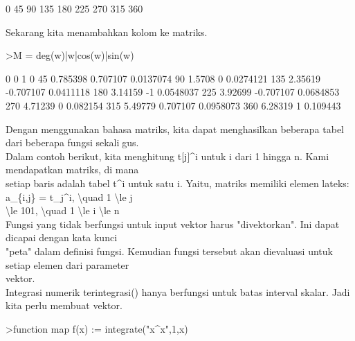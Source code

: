\documentclass[a4paper,10pt]{article}
\begin{document}
\begin{eulernotebook}
\begin{eulercomment}
\begin{eulercomment}
\begin{eulercomment}
\begin{eulercomment}
\begin{euleroutput}
              0 
             45 
             90 
            135 
            180 
            225 
            270 
            315 
            360 
\end{euleroutput}
\begin{eulercomment}
Sekarang kita menambahkan kolom ke matriks.
\end{eulercomment}
\begin{eulerprompt}
>M = deg(w)|w|cos(w)|sin(w)
\end{eulerprompt}
\begin{euleroutput}
              0             0             1             0 
             45      0.785398      0.707107     0.0137074 
             90        1.5708             0     0.0274121 
            135       2.35619     -0.707107     0.0411118 
            180       3.14159            -1     0.0548037 
            225       3.92699     -0.707107     0.0684853 
            270       4.71239             0      0.082154 
            315       5.49779      0.707107     0.0958073 
            360       6.28319             1      0.109443 
\end{euleroutput}
\begin{eulercomment}
Dengan menggunakan bahasa matriks, kita dapat menghasilkan beberapa
tabel dari beberapa fungsi sekaligus.\\
Dalam contoh berikut, kita menghitung t[j]\textasciicircum{}i untuk i dari 1 hingga n.
Kami mendapatkan matriks, di mana\\
setiap baris adalah tabel t\textasciicircum{}i untuk satu i. Yaitu, matriks memiliki
elemen lateks: a\_\{i,j\} = t\_j\textasciicircum{}i, \textbackslash{}quad 1 \textbackslash{}le j\\
\textbackslash{}le 101, \textbackslash{}quad 1 \textbackslash{}le i \textbackslash{}le n\\
Fungsi yang tidak berfungsi untuk input vektor harus "divektorkan".
Ini dapat dicapai dengan kata kunci\\
"peta" dalam definisi fungsi. Kemudian fungsi tersebut akan dievaluasi
untuk setiap elemen dari parameter\\
vektor.\\
Integrasi numerik terintegrasi() hanya berfungsi untuk batas interval
skalar. Jadi kita perlu membuat vektor.
\end{eulercomment}
\begin{eulerprompt}
>function map f(x) := integrate("x^x",1,x)
\end{eulerprompt}
\begin{eulercomment}

\end{eulercomment}
\end{eulercomment}
\end{eulercomment}
\end{eulercomment}
\end{eulercomment}
\end{eulernotebook}
\end{document}
